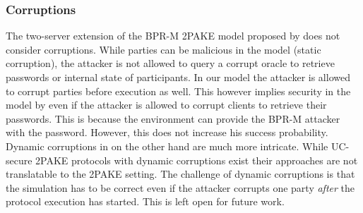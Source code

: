 \subsubsection{Corruptions}
The two-server extension of the \ac{BPR-M} \ac{2PAKE} model proposed by \citet{Katz2012a} does not consider corruptions.
While parties can be malicious in the model (static corruption), the attacker is not allowed to query a corrupt oracle to retrieve passwords or internal state of participants.
In our model the attacker is allowed to corrupt parties before execution as well.
This however implies security in the model by \citet{Katz2012a} even if the attacker is allowed to corrupt clients to retrieve their passwords.
This is because the environment can provide the \ac{BPR-M} attacker with the password.
However, this does not increase his success probability.
Dynamic corruptions in \FTWOPAKE on the other hand are much more intricate.
While \ac{UC}-secure \ac{2PAKE} protocols with dynamic corruptions exist \cite{AbdallaBP14a} their approaches are not translatable to the \ac{2PAKE} setting.
The challenge of dynamic corruptions is that the simulation has to be correct even if the attacker corrupts one party \emph{after} the protocol execution has started.
This is left open for future work.
